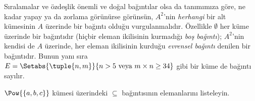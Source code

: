 \begin{explain}
Sıralamalar ve özdeşlik önemli ve doğal bağıntılar olsa da tanımımıza göre,
ne kadar yapay ya da zorlama görünürse görünsün, $A^{2}$'nin \emph{herhangi}
bir alt kümesinin $A$ üzerinde bir bağıntı olduğu vurgulanmalıdır. Özellikle
$\emptyset$ her küme üzerinde bir bağıntıdır (hiçbir eleman ikilisinin kurmadığı
\emph{boş bağıntı}); $A^{2}$'nin kendisi de $A$ üzerinde, her eleman ikilisinin
kurduğu \emph{evrensel bağıntı} denilen bir bağıntıdır. Bunun yanı sıra
$E=\Setabs{\tuple{n, m}}{n>5 \text{ veya } m \times n \ge 34}$ gibi bir küme de
bağıntı sayılır.
\end{explain}

\begin{prob}
  $\Pow{\{a, b, c\}}$ kümesi üzerindeki $\subseteq$ bağıntısının elemanlarını
  listeleyin.
\end{prob}


